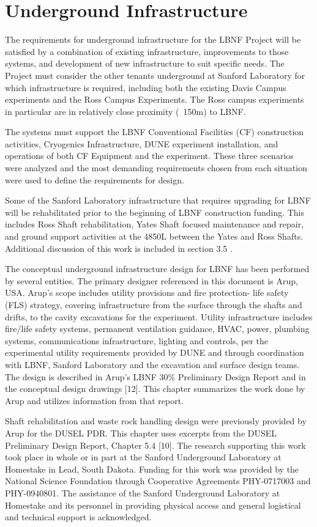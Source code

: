 \chapter{Underground Infrastructure}
\label{ch:fscf-und-infra}

The requirements for underground infrastructure for the LBNF Project will be satisfied by a combination of existing infrastructure, improvements to those systems, and development of new infrastructure to suit specific needs. The Project must consider the other tenants underground at Sanford Laboratory for which infrastructure is required, including both the existing Davis Campus experiments and the Ross Campus Experiments.  The Ross campus experiments in particular are in relatively close proximity (~150m) to LBNF.

The systems must support the LBNF Conventional Facilities (CF) construction activities, Cryogenics Infrastructure, DUNE experiment installation, and operations of both CF Equipment and the experiment. These three scenarios were analyzed and the most demanding requirements chosen from each situation were used to define the requirements for design.

Some of the Sanford Laboratory infrastructure that requires upgrading for LBNF will be rehabilitated prior to the beginning of LBNF construction funding. This includes Ross Shaft rehabilitation, Yates Shaft focused maintenance and repair, and ground support activities at the 4850L between the Yates and Ross Shafts. Additional discussion of this work is included in section 3.5 .

The conceptual underground infrastructure design for LBNF has been performed by several entities. The primary designer referenced in this document is Arup, USA. Arup’s scope includes utility provisions and fire protection- life safety (FLS) strategy, covering infrastructure from the surface through the shafts and drifts, to the cavity excavations for the experiment. Utility infrastructure includes fire/life safety systems, permanent ventilation guidance, HVAC, power, plumbing systems, communications infrastructure, lighting and controls, per the experimental utility requirements provided by DUNE and through coordination with LBNF, Sanford Laboratory and the excavation and surface design teams. The design is described in Arup’s LBNF 30\% Preliminary Design Report and in the conceptual design drawings [12]. This chapter summarizes the work done by Arup and utilizes information from that report.

Shaft rehabilitation and waste rock handling design were previously provided by Arup for the DUSEL PDR. This chapter uses excerpts from the DUSEL Preliminary Design Report, Chapter 5.4 [10]. The research supporting this work took place in whole or in part at the Sanford Underground Laboratory at Homestake in Lead, South Dakota. Funding for this work was provided by the National Science Foundation through Cooperative Agreements PHY-0717003 and PHY-0940801. The assistance of the Sanford Underground Laboratory at Homestake and its personnel in providing physical access and general logistical and technical support is acknowledged.

